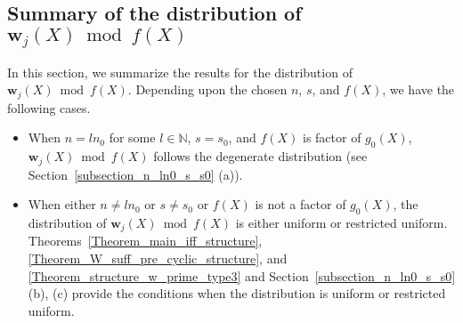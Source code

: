 \documentclass[10pt,journal]{IEEEtran}
\begin{document}

\subsection{Summary of the distribution of $\mathbf{w}_j(X) \bmod f(X)$}
\label{subsection_sumary_distri_wj}

In this section, we summarize the results for the distribution of $\mathbf{w}_j(X) \bmod f(X)$.
Depending upon the chosen $n$, $s$, and $f(X)$, we have the following cases.
% 
\begin{itemize}
% 
\item When $n = ln_0$ for some $l \in \mathbb{N}$, $s=s_0$, and $f(X)$ is factor of $g_0(X)$, 
$\mathbf{w}_j(X) \bmod f(X)$ follows the degenerate distribution (see Section~\ref{subsection_n_ln0_s_s0} (a)).
% 
\item When either $n \neq ln_0$ or $s \neq s_0$ or $f(X)$ is not a factor of $g_0(X)$, the distribution of $\mathbf{w}_j(X) \bmod f(X)$ is 
either uniform or restricted uniform. Theorems~\ref{Theorem_main_iff_structure}, \ref{Theorem_W_suff_pre_cyclic_structure}, 
and \ref{Theorem_structure_w_prime_type3} and Section~\ref{subsection_n_ln0_s_s0} (b), (c)
provide the conditions when the distribution is uniform or restricted uniform. 
%  
\end{itemize}


\end{document}
